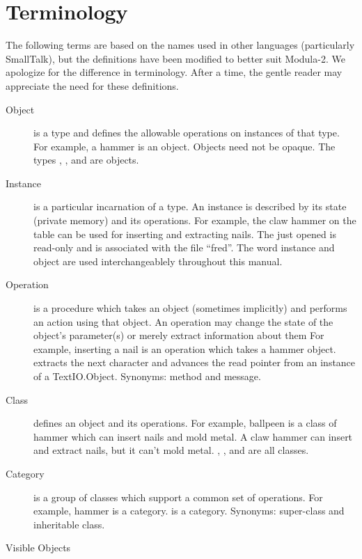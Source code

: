 \section{Terminology}
The following terms are based on the names used in other languages
(particularly SmallTalk), but the definitions have been modified to
better suit Modula-2.  We apologize for the difference in terminology.
After a time, the gentle reader may appreciate the need for these
definitions.

\begin{description}
\item[Object] 
    is a type and defines the allowable operations on instances of
    that type.  For example,
    a hammer is an object.  Objects need not be opaque.  The types
    , , and  are objects.
\item[Instance] 
    is a particular incarnation of a type.  An instance is described
    by its state (private memory) and its operations.
    For example, the claw hammer on the table can be used for inserting
    and extracting nails.  The  just opened is
    read-only and is associated with the file ``fred''.
    The word instance and object are used interchangeablely
    throughout this manual.
\item[Operation]   
    is a procedure which takes an object (sometimes implicitly) and
    performs an action using that object.  An operation may change the
    state of the object's parameter(s) or merely extract information about them
    For example, inserting a nail is an operation which takes a hammer object.
     extracts the next character and advances the
    read pointer from an instance of a {TextIO.Object}.
    Synonyms: method and message.
\item[Class] 
    defines an object and its operations.  For example,
    ballpeen is a class of hammer which can insert nails and mold
    metal.  A claw hammer can insert and extract nails, but it can't
    mold metal.  , 
    , and  are all classes.
\item[Category] 
    is a group of classes which support a common set of operations.
    For example, hammer is a category.   is a category.
    Synonyms: super-class and inheritable class.
\item[Visible Objects] 

\end{description}

